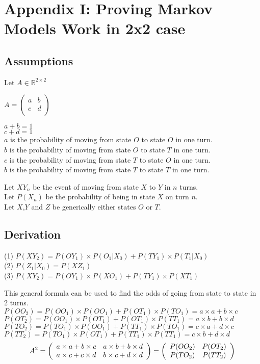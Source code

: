 \section{Appendix I: Proving Markov Models Work in 2x2 case}
\subsection{Assumptions}

Let $A \in \mathbb{R}^{2\times2}$

$A =
\begin{pmatrix}
  a & b\\
  c & d\\
\end{pmatrix}
$

$a+b=1$\\
$c+d=1$\\
$a$ is the probability of moving from state $O$ to state $O$ in one turn.\\
$b$ is the probability of moving from state $O$ to state $T$ in one turn.\\
$c$ is the probability of moving from state $T$ to state $O$ in one turn.\\
$b$ is the probability of moving from state $T$ to state $T$ in one turn.

Let $XY_n$ be the event of moving from state $X$ to $Y$ in $n$ turns. \\
Let $P(X_n)$ be the probability of being in state $X$ on turn $n$.\\
Let $X$,$Y$ and $Z$ be generically either states $O$ or $T$.

\subsection{Derivation}

(1) $P(XY_2) = P(OY_1) \times P(O_1|X_0)+P(TY_1) \times P(T_1|X_0)$\\
(2) $P(Z_1|X_0) = P(XZ_1)$\\
(3) $P(XY_2) = P(OY_1) \times P(XO_1)+P(TY_1) \times P(XT_1)$

This general formula can be used to find the odds of going from state to state in 2 turns.\\
$P(OO_2) = P(OO_1) \times P(OO_1)+P(OT_1) \times P(TO_1) = a \times a + b \times c$\\
$P(OT_2) = P(OO_1) \times P(OT_1)+P(OT_1) \times P(TT_1) = a \times b + b \times d$\\
$P(TO_2) = P(TO_1) \times P(OO_1)+P(TT_1) \times P(TO_1) = c \times a + d \times c$\\
$P(TT_2) = P(TO_1) \times P(OT_1)+P(TT_1) \times P(TT_1) = c \times b + d \times d$
\[
A^2 = 
\left(
\begin{array}{c c}
a \times a+b \times c & a \times b+b \times d \\
a \times c+c \times d & b \times c+d \times d \\
\end{array}
\right)
=
\left(
\begin{array}{c c}
P(OO_2) & P(OT_2) \\
P(TO_2) & P(TT_2) \\
\end{array}
\right) \]
